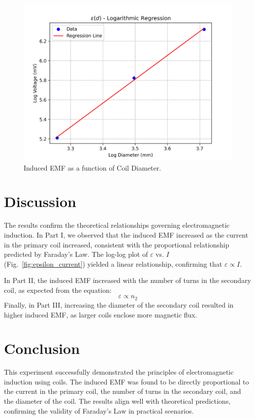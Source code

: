 \documentclass[journal]{IEEEtran}
\begin{document}
\begin{figure}[H]
    \centering
    \includegraphics[width=0.9\linewidth]{output_plots/epsilonD.png}
    \caption{Induced EMF as a function of Coil Diameter.}
    \label{fig:epsilon_diameter}
\end{figure}

\section{Discussion}
The results confirm the theoretical relationships governing electromagnetic 
induction. In Part I, we observed that the induced EMF increased as the current
 in the primary coil increased, consistent with the proportional relationship 
predicted by Faraday’s Law. The log-log plot of \(\varepsilon\) vs. \(I\) (Fig.~\ref{fig:epsilon_current}) yielded a linear relationship, confirming that \(\varepsilon \propto I\).

In Part II, the induced EMF increased with the number of turns in the secondary coil, as expected from the equation:
\begin{equation}
    \varepsilon \propto n_2
\end{equation}
Finally, in Part III, increasing the diameter of the secondary coil resulted in 
higher induced EMF, as larger coils enclose more magnetic flux.

\section{Conclusion}
This experiment successfully demonstrated the principles of electromagnetic induction using coils. The induced EMF was found to be directly proportional to the current in the primary coil, the number of turns in the secondary coil, and the diameter of the coil. The results align well with theoretical predictions, confirming the validity of Faraday's Law in practical scenarios.
\end{document}
